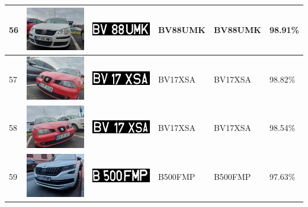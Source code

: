 \documentclass[a4paper,12pt]{report}
\begin{document}
\begin{longtable}{| m{0.6cm} | m{3cm} | m{3cm} | m{1.8cm} | m{1.8cm} | m{1.8cm} |}
    56  & \includegraphics[width=3cm,keepaspectratio]{dataset/31_d1.jpg}  & \includegraphics[width=3cm,keepaspectratio]{segmentari/56.jpg}  & BV88UMK             & BV88UMK              & 98.91\%    \\ \hline
    57  & \includegraphics[width=3cm,keepaspectratio]{dataset/32_d1.jpg}  & \includegraphics[width=3cm,keepaspectratio]{segmentari/57.jpg}  & BV17XSA             & BV17XSA              & 98.82\%    \\ \hline
    58  & \includegraphics[width=3cm,keepaspectratio]{dataset/32_s1.jpg}  & \includegraphics[width=3cm,keepaspectratio]{segmentari/58.jpg}  & BV17XSA             & BV17XSA              & 98.54\%    \\ \hline
    59  & \includegraphics[width=3cm,keepaspectratio]{dataset/33_d1.jpg}  & \includegraphics[width=3cm,keepaspectratio]{segmentari/59.jpg}  & B500FMP             & B500FMP              & 97.63\%    \\ \hline

\end{longtable}
\end{document}
